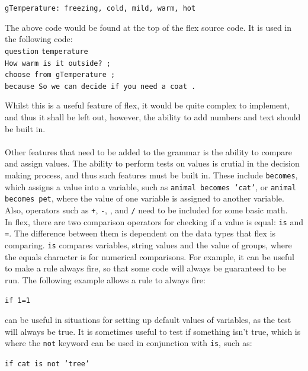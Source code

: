\documentclass[12pt]{report}
\begin{document}
\texttt{gTemperature: freezing, cold, mild, warm, hot}\\
\begin{tabbing}
The above code would be found at the top of the flex source code.  It is used in the following code:\\
\texttt{question} \= \texttt{temperature}\\
\> \texttt{How warm is it outside? ;}\\
\> \texttt{choose from gTemperature ;}\\
\> \texttt{because So we can decide if you need a coat .}\\
\end{tabbing}
Whilst this is a useful feature of flex, it would be quite complex to implement, and thus it shall be left out, however, the ability to add numbers and text should be built in.
\\
\\
Other features that need to be added to the grammar is the ability to compare and assign values.  The ability to perform tests on values is crutial in the decision making process, and thus such features must be built in.  These include \texttt{becomes}, which assigns a value into a variable, such as \texttt{animal becomes 'cat'}, or \texttt{animal becomes pet}, where the value of one variable is assigned to another variable.  Also, operators such as \texttt{+}, \texttt{-}, \texttt{\*}, and \texttt{/} need to be included for some basic math.\\
In flex, there are two comparison operators for checking if a value is equal: \texttt{is} and \texttt{=}.  The difference between them is dependent on the data types that flex is comparing.  \texttt{is} compares variables, string values and the value of groups, where the equals character is for numerical comparisons.  For example, it can be useful to make a rule always fire, so that some code will always be guaranteed to be run.  The following example allows a rule to always fire:\\
\begin{center}
\texttt{if 1=1}
\end{center}
can be useful in situations for setting up default values of variables, as the test will always be true.  It is sometimes useful to test if something isn't true, which is where the \texttt{not} keyword can be used in conjunction with \texttt{is}, such as:\\
\begin{center}
\texttt{if cat is not 'tree'}
\end{center}
\end{document}
